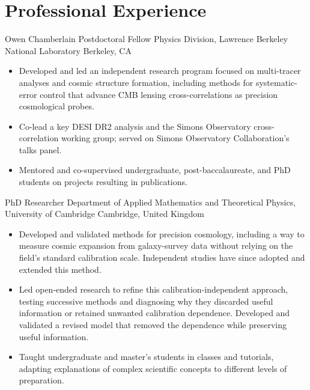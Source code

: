\documentclass[11pt,a4paper,sans]{moderncv}
\newcommand{\placeholder}[1]{%
  \textcolor{gray}{\emph{[FILL IN: #1]}}%
}
\begin{document}
\newpage
\section{Professional Experience}

  {Owen Chamberlain Postdoctoral Fellow}
  {Physics Division, Lawrence Berkeley National Laboratory}
  {Berkeley, CA}
  {}
  {\begin{itemize}
    \item Developed and led an independent research program focused on multi-tracer analyses and cosmic structure formation, including methods for systematic-error control that advance CMB lensing cross-correlations as precision cosmological probes.
    \item Co-lead a key DESI DR2 analysis and the Simons Observatory cross-correlation working group; served on Simons Observatory Collaboration's talks panel.
    \item Mentored and co-supervised undergraduate, post-baccalaureate, and PhD students on projects resulting in publications.
  \end{itemize}}

  {PhD Researcher}
  {Department of Applied Mathematics and Theoretical Physics, University of Cambridge}
  {Cambridge, United Kingdom}
  {}
  {\begin{itemize}
    \item Developed and validated methods for precision cosmology, including a way to measure cosmic expansion from galaxy-survey data without relying on the field's standard calibration scale. Independent studies have since adopted and extended this method.
    \item Led open-ended research to refine this calibration-independent approach, testing successive methods and diagnosing why they discarded useful information or retained unwanted calibration dependence. Developed and validated a revised model that removed the dependence while preserving useful information.
    \item Taught undergraduate and master’s students in classes and tutorials, adapting explanations of complex scientific concepts to different levels of preparation.
  \end{itemize}}

\end{document}
